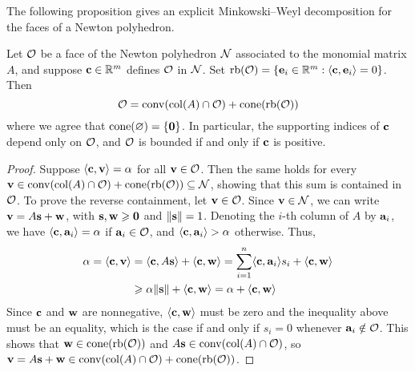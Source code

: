 \documentclass{amsart}
\begin{document}
The following proposition gives an explicit Minkowski--Weyl decomposition for the faces of a Newton polyhedron.

\begin{proposition}
   \label{prop: MW for faces}
   Let $\mathcal{O}$ be a face of the Newton polyhedron $\mathcal{N}$ associated to the monomial matrix $A$, and suppose $\mathbf{c} \in \mathbb{R}^m$ defines $\mathcal{O}$ in $\mathcal{N}$.
   Set $\operatorname{rb}(\mathcal{O}) =  \{ \mathbf{e}_i \in \mathbb{R}^m : \langle \mathbf{c}, \mathbf{e}_i \rangle = 0\}$.
   Then
   \[\mathcal{O} =  \operatorname{conv}( \operatorname{col}(A) \cap \mathcal{O} ) + \operatorname{cone}(\operatorname{rb}(\mathcal{O}))\]
   where we agree that $\operatorname{cone}(\varnothing) = \{\mathbf{0}\}$.
   In particular, the supporting indices of $\mathbf{c}$ depend only on $\mathcal{O}$, and $\mathcal{O}$ is bounded if and only if $\mathbf{c}$ is positive.
\end{proposition}

\begin{proof}
   Suppose $\langle \mathbf{c}, \mathbf{v} \rangle = \alpha$ for all $\mathbf{v} \in \mathcal{O}$.
   Then the same holds for every $\mathbf{v} \in\operatorname{conv}( \operatorname{col}(A) \cap \mathcal{O} ) + \operatorname{cone}(\operatorname{rb}(\mathcal{O})) \subseteq \mathcal{N}$, showing that this sum is contained in  $\mathcal{O}$.
   To prove the reverse containment, let $\mathbf{v} \in \mathcal{O}$.
   Since $\mathbf{v} \in \mathcal{N}$, we can write $\mathbf{v} = A \mathbf{s} + \mathbf{w}$, with $\mathbf{s}, \mathbf{w}\geqslant \mathbf{0}$ and $\| \mathbf{s} \| = 1$.
   Denoting the $i$-th column of $A$ by $\mathbf{a}_i$, we have $\langle \mathbf{c}, \mathbf{a}_i \rangle = \alpha$ if $\mathbf{a}_i \in \mathcal{O}$, and $\langle \mathbf{c}, \mathbf{a}_i \rangle > \alpha$ otherwise.
   Thus, 
   \begin{align*}
     \alpha = \langle \mathbf{c}, \mathbf{v} \rangle &= \langle \mathbf{c}, A\mathbf{s} \rangle + \langle \mathbf{c}, \mathbf{w} \rangle
     = \sum_{i=1}^n \langle \mathbf{c}, \mathbf{a}_i \rangle s_i + \langle \mathbf{c}, \mathbf{w} \rangle\\
     &\geqslant \alpha \| \mathbf{s} \| + \langle \mathbf{c}, \mathbf{w} \rangle = \alpha + \langle \mathbf{c}, \mathbf{w} \rangle
   \end{align*}
   Since $\mathbf{c}$ and $\mathbf{w}$ are nonnegative, $\langle \mathbf{c}, \mathbf{w} \rangle$ must be zero and the inequality above must be an equality, which is the case if and only if $s_i = 0$ whenever $\mathbf{a}_i \notin \mathcal{O}$.
   This shows that $\mathbf{w} \in \operatorname{cone}(\operatorname{rb}(\mathcal{O}))$ and $A\mathbf{s} \in \operatorname{conv}(\operatorname{col}(A) \cap \mathcal{O})$, so $\mathbf{v} = A\mathbf{s} + \mathbf{w} \in \operatorname{conv}( \operatorname{col}(A) \cap \mathcal{O} ) + \operatorname{cone}(\operatorname{rb}(\mathcal{O}))$.
\end{proof}
\end{document}
